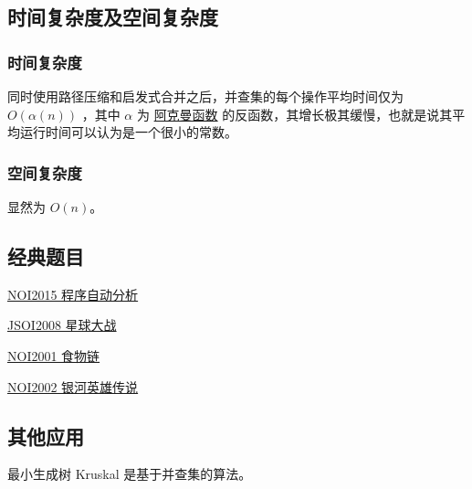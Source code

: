 \subsection{时间复杂度及空间复杂度}

\subsubsection{时间复杂度}

同时使用路径压缩和启发式合并之后，并查集的每个操作平均时间仅为 $O(\alpha(n))$ ，其中 $\alpha$ 为 \href{https://en.wikipedia.org/wiki/Ackermann_function}{阿克曼函数} 的反函数，其增长极其缓慢，也就是说其平均运行时间可以认为是一个很小的常数。 

\subsubsection{空间复杂度}

显然为 $O(n)$。

\subsection{经典题目}

\href{https://www.lydsy.com/JudgeOnline/problem.php?id=4195}{NOI2015 程序自动分析}

\href{https://www.lydsy.com/JudgeOnline/problem.php?id=1015}{JSOI2008 星球大战}

\href{https://www.luogu.org/problemnew/show/P2024}{NOI2001 食物链}

\href{https://www.luogu.org/problemnew/show/P1196}{NOI2002 银河英雄传说}

\subsection{其他应用}

 最小生成树  Kruskal 是基于并查集的算法。
